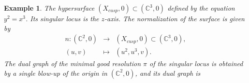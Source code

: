 \documentclass[reqno,dvipsnames,12pt]{amsart}
\newtheorem{exam}[thm]{Example}
\begin{document}
\begin{exam}\label{cuspensurface}
  The hypersurface \((X_{cusp},0) \subset (\mathbb{C}^3,0)\) defined by the equation \(y^2 = x^3\). Its singular locus is the \(z\)-axis. The normalization of the surface is given by
\[
\begin{array}{rcl}
n \colon (\mathbb{C}^2,0) &\longrightarrow& (X_{cusp},0) \subset (\mathbb{C}^3,0),\\[1mm]
(u,v) &\longmapsto& (u^2, u^3, v).
\end{array}
\]
The dual graph of the minimal good resolution \(\pi\) of the singular locus is obtained by a single blow-up of the origin in \((\mathbb{C}^2,0)\), and its dual graph is
 \begin{figure}[H]
\centering
{}
\end{figure}
\end{exam}
\end{document}
